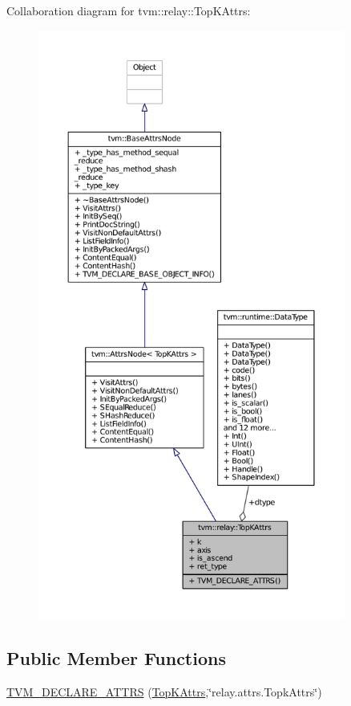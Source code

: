 Collaboration diagram for tvm\+:\+:relay\+:\+:Top\+K\+Attrs\+:
\nopagebreak
\begin{figure}[H]
\begin{center}
\leavevmode
\includegraphics[height=550pt]{structtvm_1_1relay_1_1TopKAttrs__coll__graph}
\end{center}
\end{figure}
\subsection*{Public Member Functions}
\begin{DoxyCompactItemize}
\item 
\hyperlink{structtvm_1_1relay_1_1TopKAttrs_a2d9b93c511148c070e7d5974d2620c6e}{T\+V\+M\+\_\+\+D\+E\+C\+L\+A\+R\+E\+\_\+\+A\+T\+T\+RS} (\hyperlink{structtvm_1_1relay_1_1TopKAttrs}{Top\+K\+Attrs},\char`\"{}relay.\+attrs.\+Topk\+Attrs\char`\"{})
\end{DoxyCompactItemize}
